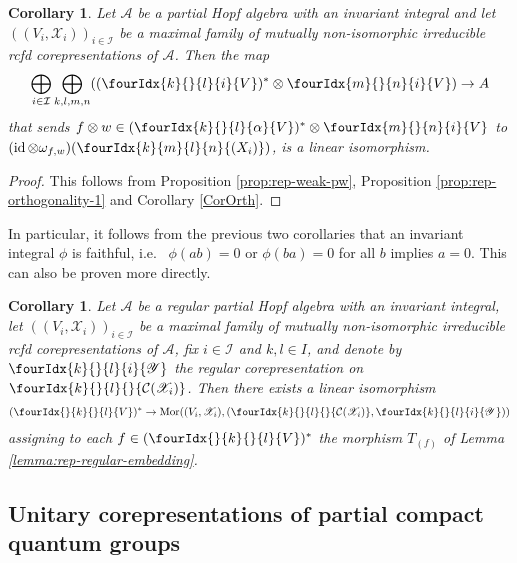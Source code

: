 \documentclass[10pt]{article}
\DeclareMathOperator{\id}{id}
\newcommand{\dual}[1]{#1^{*}}
\newcommand{\Mor}{\mathrm{Mor}}
\newcommand{\Gr}[5]{\fourIdx{#2}{#4}{#3}{#5}{#1}}%
\newcommand{\Gru}[3]{\Gr{#1}{}{}{#2}{#3}}
\newcommand{\Grd}[3]{\Gr{#1}{#2}{#3}{}{}}
\newtheorem{Cor}[Theorem]{Corollary}
\theoremstyle{definition}
\numberwithin{equation}{section}
\begin{document}
\begin{Cor} \label{cor:rep-pw}
  Let $\mathscr{A}$ be a partial Hopf algebra with an invariant integral and let
  $((V_{i},\mathscr{X}_{i}))_{i \in \mathcal{I}}$ be a maximal family of mutually non-isomorphic irreducible rcfd corepresentations of
  $\mathscr{A}$. Then the map
  \begin{align*}
    \bigoplus_{i \in \mathcal{I}} \bigoplus_{k,l,m,n}
    (\dual{(\Gr{V}{k}{l}{}{i})} \otimes
    \Gr{V}{m}{n}{}{i}) \to A
  \end{align*}
  that sends $f \otimes w \in
  \dual{(\Gr{V}{k}{l}{}{\alpha})} \otimes
  \Gr{V}{m}{n}{}{i}$ to $ (\id \otimes
  \omega_{f,w})(\Gr{(X_{i})}{k}{l}{m}{n})$,
  is a linear isomorphism. 
\end{Cor}
\begin{proof} This follows from Proposition \ref{prop:rep-weak-pw}, Proposition \ref{prop:rep-orthogonality-1} and Corollary \ref{CorOrth}.
\end{proof}

In particular, it follows from the previous two corollaries that an invariant integral $\phi$ is faithful, i.e.~ $\phi(ab)=0$ or $\phi(ba)=0$ for all $b$ implies $a=0$. This can also be proven more directly.

\begin{Cor} \label{cor:rep-pw-morphisms}
  Let $\mathscr{A}$ be a regular partial Hopf algebra with an invariant integral, let
  $((V_{i},\mathscr{X}_{i}))_{i\in \mathcal{I}}$ be a maximal
  family of mutually non-isomorphic irreducible rcfd corepresentations of $\mathscr{A}$,
  fix $i \in \mathcal{I}$ and $k,l\in I$, and denote by $\Gr{\mathscr{Y}}{k}{l}{}{i}$
  the regular corepresentation on
  $\Grd{\mathcal{C}(\mathscr{X}_i)}{k}{l}$. Then there exists a
  linear isomorphism
  \begin{align*}
    \dual{( \Gru{V}{k}{l})} \to
    \Mor((V_{i},\mathscr{X}_{i}),
    (\Grd{\mathcal{C}(\mathscr{X}_i)}{k}{l},\Gr{\mathscr{Y}}{k}{l}{}{i}))
  \end{align*}
  assigning to each $f\in     \dual{( \Gru{V}{k}{l})}$ the morphism
  $T_{(f)}$ of Lemma \ref{lemma:rep-regular-embedding}.
\end{Cor}



\subsection{Unitary corepresentations of partial compact quantum groups}
\end{document}
